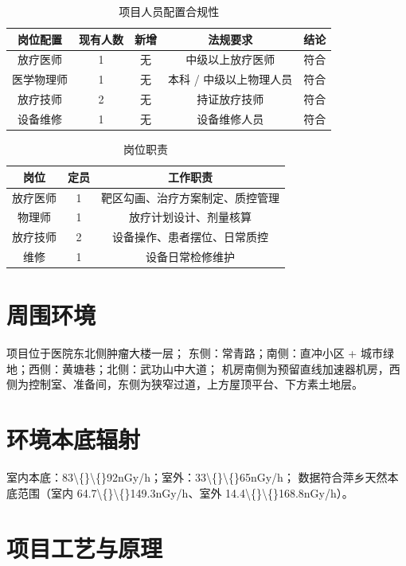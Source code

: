 \begin{table}[H]
\centering
\caption{项目人员配置合规性}
\begin{tabular}{|c|c|c|c|c|}
\hline
岗位配置 & 现有人数 & 新增 & 法规要求 & 结论 \\
\hline
放疗医师 & 1 & 无 & 中级以上放疗医师 & 符合 \\
\hline
医学物理师 & 1 & 无 & 本科 / 中级以上物理人员 & 符合 \\
\hline
放疗技师 & 2 & 无 & 持证放疗技师 & 符合 \\
\hline
设备维修 & 1 & 无 & 设备维修人员 & 符合 \\
\hline
\end{tabular}
\end{table}



\begin{table}[H]
\centering
\caption{岗位职责}
\begin{tabular}{|c|c|c|}
\hline
岗位 & 定员 & 工作职责 \\
\hline
放疗医师 & 1 & 靶区勾画、治疗方案制定、质控管理 \\
\hline
物理师 & 1 & 放疗计划设计、剂量核算 \\
\hline
放疗技师 & 2 & 设备操作、患者摆位、日常质控 \\
\hline
维修 & 1 & 设备日常检修维护 \\
\hline
\end{tabular}
\end{table}


\section{周围环境}

项目位于医院东北侧肿瘤大楼一层；
东侧：常青路；南侧：直冲小区 + 城市绿地；西侧：黄塘巷；北侧：武功山中大道；
机房南侧为预留直线加速器机房，西侧为控制室、准备间，东侧为狭窄过道，上方屋顶平台、下方素土地层。

\section{环境本底辐射}

室内本底：83\textbackslash\{\}\textbackslash\{\}92nGy/h；室外：33\textbackslash\{\}\textbackslash\{\}65nGy/h；
数据符合萍乡天然本底范围（室内 64.7\textbackslash\{\}\textbackslash\{\}149.3nGy/h、室外 14.4\textbackslash\{\}\textbackslash\{\}168.8nGy/h）。

\section{项目工艺与原理}

